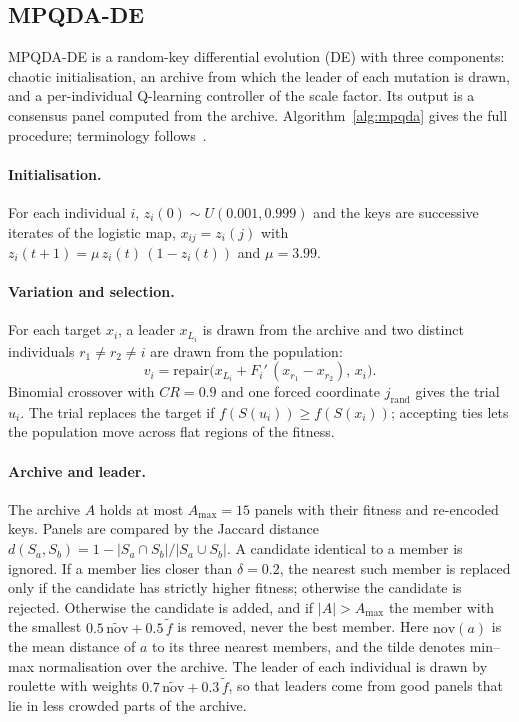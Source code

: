 \subsection{MPQDA-DE}\label{sec:mpqda}

MPQDA-DE is a random-key differential evolution (DE) with three components: chaotic initialisation, an archive from which the
leader of each mutation is drawn, and a per-individual Q-learning controller of the scale factor. Its output is a consensus
panel computed from the archive. Algorithm~\ref{alg:mpqda} gives the full procedure; terminology follows~\cite{eiben2015}.

\paragraph{Initialisation.} For each individual $i$, $z_i(0)\sim U(0.001,0.999)$ and the keys are successive iterates of the
logistic map, $x_{ij}=z_i(j)$ with $z_i(t+1)=\mu\,z_i(t)\,(1-z_i(t))$ and $\mu=3.99$.

\paragraph{Variation and selection.} For each target $x_i$, a leader $x_{L_i}$ is drawn from the archive and two distinct
individuals $r_1\neq r_2\neq i$ are drawn from the population:
\begin{equation}\label{eq:mutation}
  v_i=\mathrm{repair}\big(x_{L_i}+F_i'\,(x_{r_1}-x_{r_2}),\,x_i\big).
\end{equation}
Binomial crossover with $CR=0.9$ and one forced coordinate $j_{\mathrm{rand}}$ gives the trial $u_i$. The trial replaces the
target if $f(S(u_i))\ge f(S(x_i))$; accepting ties lets the population move across flat regions of the fitness.

\paragraph{Archive and leader.} The archive $A$ holds at most $A_{\max}=15$ panels with their fitness and re-encoded keys. Panels
are compared by the Jaccard distance $d(S_a,S_b)=1-|S_a\cap S_b|/|S_a\cup S_b|$. A candidate identical to a member is ignored.
If a member lies closer than $\delta=0.2$, the nearest such member is replaced only if the candidate has strictly higher fitness;
otherwise the candidate is rejected. Otherwise the candidate is added, and if $|A|>A_{\max}$ the member with the smallest
$0.5\,\widetilde{\mathrm{nov}}+0.5\,\tilde f$ is removed, never the best member. Here $\mathrm{nov}(a)$ is the mean distance of
$a$ to its three nearest members, and the tilde denotes min--max normalisation over the archive. The leader of each individual
is drawn by roulette with weights $0.7\,\widetilde{\mathrm{nov}}+0.3\,\tilde f$, so that leaders come from good panels that lie
in less crowded parts of the archive.

